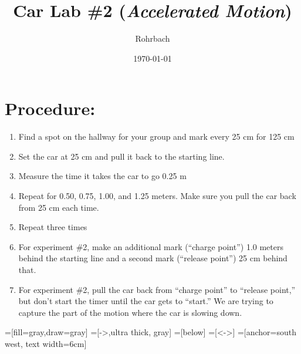 \documentclass[10pt]{exam}
\title{Car Lab \#2 (\emph{Accelerated Motion})}
\author{Rohrbach}
\date{\today}
\begin{document}
\maketitle

\vspace{-1em}
\section*{Procedure:}
  \begin{enumerate}[label=\alph*),topsep=0pt,itemsep=-1ex,partopsep=1ex,parsep=1ex]
    \item 
      Find a spot on the hallway for your group and mark every 25 cm for 125 cm
    \item 
      Set the car at 25 cm and pull it back to the starting line.
    \item 
      Measure the time it takes the car to go 0.25 m
    \item
      Repeat for 0.50, 0.75, 1.00, and 1.25 meters.  Make sure you pull the car back from 25 cm each time.
    \item
      Repeat three times
    \item 
      For experiment \#2, make an additional mark (``charge point'') 1.0 meters behind the starting line and a second mark (``release point'') 25 cm behind that.
    \item 
      For experiment \#2, pull the car back from ``charge point'' to ``release point,'' but don't start the timer until the car gets to ``start.''  We are trying to capture the part of the motion where the car is slowing down.
  \end{enumerate}

  =[fill=gray,draw=gray]
  =[->,ultra thick, gray]
  =[below]
  =[<->]
  =[anchor=south west, text width=6cm]
  \def\markwidth{.02}
  \def\abovesp{0.3}
  \tikzset{x=5cm}
\end{document}
